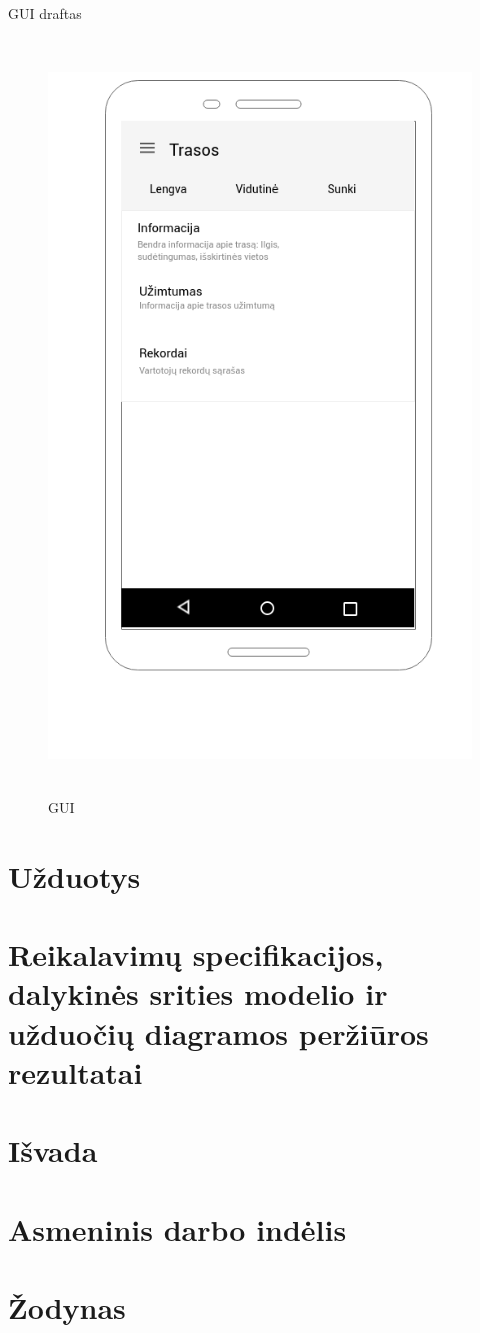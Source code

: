 \documentclass[oneside]{VUMIFPSkursinis}
\begin{document}
GUI draftas
\begin{figure}[H]
		\centering	
	\includegraphics[width=18cm,height=20cm,keepaspectratio]{GUI.png}
	\caption{GUI}
	\label{fig:GUI}
\end{figure}









 
	

\section{Užduotys}

\section{Reikalavimų specifikacijos, dalykinės srities modelio ir užduočių diagramos peržiūros rezultatai}

\section{Išvada}

\section{Asmeninis darbo indėlis}

\section{Žodynas}


	
	
\end{document}
